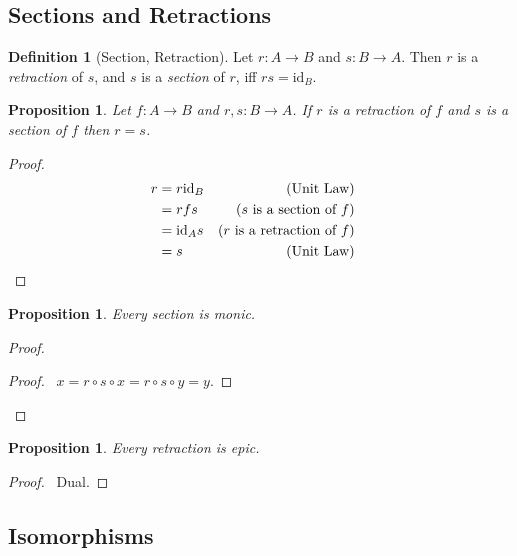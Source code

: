 \documentclass{book}
\let\qed\relax
\newtheorem{prop}[ax]{Proposition}
\theoremstyle{definition}
\newtheorem{df}[ax]{Definition}
\newcommand{\id}[1]{\ensuremath{\mathrm{id}_{#1}}}
\begin{document}
\subsection{Sections and Retractions}

\begin{df}[Section, Retraction]
Let $r : A \rightarrow B$ and $s : B \rightarrow A$. Then $r$ is a \emph{retraction} of $s$, and $s$ is a \emph{section} of $r$, iff $rs = \id{B}$.
\end{df}

\begin{prop}
\label{prop:section_is_retraction}
Let $f : A \rightarrow B$ and $r,s : B \rightarrow A$. If $r$ is a retraction of $f$ and $s$ is a section of $f$ then $r = s$.
\end{prop}

\begin{proof}
\pf
\begin{align*}
r & = r \id{B} & (\text{Unit Law}) \\
& = r f s & (\text{$s$ is a section of $f$}) \\
& = \id{A} s & (\text{$r$ is a retraction of $f$}) \\
& = s & (\text{Unit Law}) & \qed
\end{align*}
\end{proof}

\begin{prop}
Every section is monic.
\end{prop}

\begin{proof}
\pf
{}
\begin{proof}
	\pf\ $x = r \circ s \circ x = r \circ s \circ y = y$.
\end{proof}
\qed
\end{proof}

\begin{prop}
Every retraction is epic.
\end{prop}

\begin{proof}
\pf\ Dual. \qed
\end{proof}

\subsection{Isomorphisms}
\end{document}
